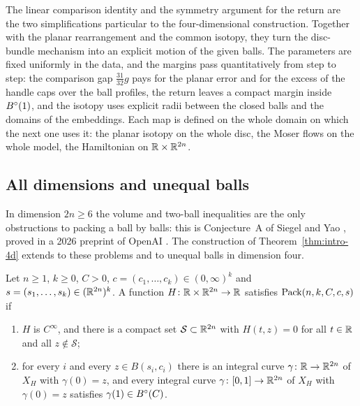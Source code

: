 The linear comparison identity and the symmetry argument for the return are the two simplifications particular
to the four-dimensional construction. Together with the planar rearrangement and the common isotopy, they turn
the disc-bundle mechanism into an explicit motion of the given balls. The parameters are fixed uniformly in the
data, and the margins pass quantitatively from step to step: the comparison gap
$\frac{31}{32}g$ pays for the planar error and for the excess of the handle caps over the ball profiles, the return
leaves a compact margin inside $B^{\circ}(1)$, and the isotopy uses explicit radii between the closed balls and the domains of
the embeddings. Each map is defined on the whole domain on which the next one uses it: the planar isotopy on the
whole disc, the Moser flows on the whole model, the Hamiltonian on $\mathbb{R}\times\mathbb{R}^{2n}$.

\subsection{All dimensions and unequal balls}\label{sec:intro-results}

In dimension $2n\ge6$ the volume and two-ball inequalities are the only obstructions to packing a ball by balls: this
is Conjecture~A of Siegel and Yao \cite{SiegelYao2025}, proved in a 2026 preprint of OpenAI \cite{OpenAI2026}.
The construction of Theorem~\ref{thm:intro-4d} extends to these problems and to unequal balls in
dimension four.

\begin{definition}\label{def:intro-spec}
Let $n\ge1$, $k\ge0$, $C>0$, $c=(c_1,\dots,c_k)\in(0,\infty)^k$ and $s=(s_1,\dots,s_k)\in(\mathbb{R}^{2n})^k$. A
function $H\colon\mathbb{R}\times\mathbb{R}^{2n}\to\mathbb{R}$ satisfies $\mathrm{Pack}(n,k,C,c,s)$ if
\begin{enumerate}[label=(\alph*)]
\item $H$ is $C^\infty$, and there is a compact set $\mathcal S\subset\mathbb{R}^{2n}$ with $H(t,z)=0$ for all
 $t\in\mathbb{R}$ and all $z\notin\mathcal S$;
\item for every $i$ and every $z\in B(s_i,c_i)$ there is an integral curve $\gamma\colon\mathbb{R}\to\mathbb{R}^{2n}$ of
 $X_H$ with $\gamma(0)=z$, and every integral curve $\gamma\colon[0,1]\to\mathbb{R}^{2n}$ of $X_H$ with
 $\gamma(0)=z$ satisfies $\gamma(1)\in B^{\circ}(C)$.
\end{enumerate}
\end{definition}

